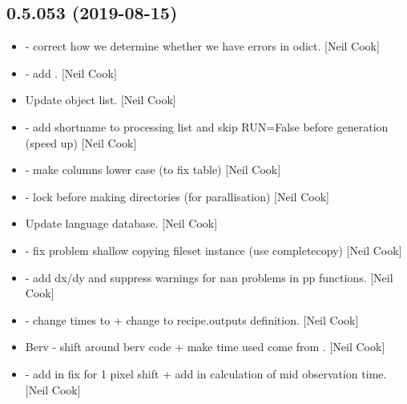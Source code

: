 \documentclass[a4paper,10pt,english]{report}
\begin{document}
\subsection{0.5.053 (2019-08-15)}
\label{\detokenize{misc/changelog:id89}}\begin{itemize}
\item {} 
 - correct how we determine whether
we have errors in odict. {[}Neil Cook{]}

\item {} 
 - add . {[}Neil Cook{]}

\item {} 
Update object list. {[}Neil Cook{]}

\item {} 
 - add shortname to processing list
and skip RUN=False before generation (speed up) {[}Neil Cook{]}

\item {} 
 - make columns lower case (to fix table) {[}Neil
Cook{]}

\item {} 
 - lock before making directories (for
parallisation) {[}Neil Cook{]}

\item {} 
Update language database. {[}Neil Cook{]}

\item {} 
 - fix problem shallow copying
fileset instance (use completecopy) {[}Neil Cook{]}

\item {} 
 - add dx/dy and suppress warnings
for nan problems in pp functions. {[}Neil Cook{]}

\item {} 
 - change times to  + change  to
recipe.outputs definition. {[}Neil Cook{]}

\item {} 
Berv - shift around berv code + make time used come from .
{[}Neil Cook{]}

\item {} 
 - add in fix for 1 pixel shift + add in
calculation of mid observation time. {[}Neil Cook{]}


\end{itemize}
\end{document}
